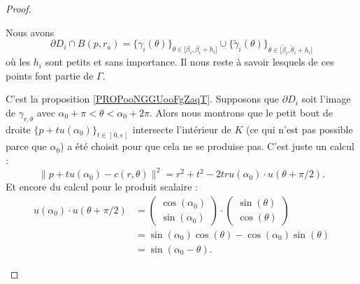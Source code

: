 \begin{proof}
\begin{subproof}
		Nous avons
		\begin{equation}
			\partial D_i\cap B(p,r_a)=\{ \gamma_i(\theta) \}_{\theta\in\mathopen[ \beta_i,\beta_i+h_i\mathclose]}\cup\{ \tilde \gamma_i(\theta) \}_{\theta\in\mathopen[ \tilde \beta_i,\tilde \theta_i+h_i\mathclose]}
		\end{equation}
		où les \( h_i\) sont petits et sans importance. Il nous reste à savoir lesquels de ces points font partie de \( \Gamma\).

		C'est la proposition \ref{PROPooNGGUooFgZaqT}.
		Supposons que \( \partial D_i\) soit l'image de \( \gamma_{r,\theta}\) avec \( \alpha_0+\pi<\theta<\alpha_0+2\pi\). Alors nous montrons que le petit bout de droite \( \{ p+tu(\alpha_0) \}_{t\in\mathopen] 0,\epsilon\mathclose[}\) intersecte l'intérieur de \( K\) (ce qui n'est pas possible parce que \( \alpha_0\)) a été choisit pour que cela ne se produise pas. C'est juste un calcul :
			\begin{equation}		\label{EQooLAEUooYOpFHb}
				\| p+tu(\alpha_0)-c(r,\theta) \|^2=r^2+t^2-2tru(\alpha_0)\cdot u(\theta+\pi/2).
			\end{equation}
			Et encore du calcul pour le produit scalaire :
			\begin{subequations}
				\begin{align}
					u(\alpha_0)\cdot u(\theta+\pi/2) & =\begin{pmatrix}
						                                    \cos(\alpha_0) \\
						                                    \sin(\alpha_0)
					                                    \end{pmatrix}\cdot\begin{pmatrix}
						                                                      \sin(\theta) \\
						                                                      \cos(\theta)
					                                                      \end{pmatrix}                      \\
					                                 & =\sin(\alpha_0)\cos(\theta)-\cos(\alpha_0)\sin(\theta) \\
					                                 & =\sin(\alpha_0-\theta).

\end{align}
\end{subequations}
\end{subproof}
\end{proof}
